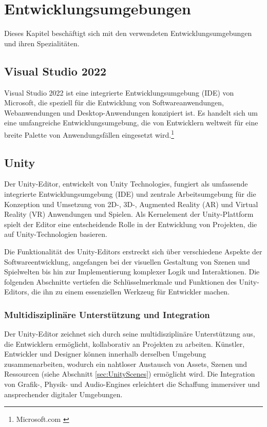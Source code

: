 \section{Entwicklungsumgebungen}
Dieses Kapitel beschäftigt sich mit den verwendeten Entwicklungsumgebungen und ihren Spezialitäten.

\subsection{Visual Studio 2022}
Visual Studio 2022 ist eine integrierte Entwicklungsumgebung (IDE) von Microsoft, die speziell für die Entwicklung von
Softwareanwendungen, Webanwendungen und Desktop-Anwendungen konzipiert ist. Es handelt sich um eine umfangreiche
Entwicklungsumgebung, die von Entwicklern weltweit für eine breite Palette von Anwendungsfällen eingesetzt wird.\footnote{Microsoft.com \cite{Visual Studio 2022}}

\subsection{Unity}
Der Unity-Editor, entwickelt von Unity Technologies, fungiert als umfassende integrierte Entwicklungsumgebung (IDE)
und zentrale Arbeitsumgebung für die Konzeption und Umsetzung von 2D-, 3D-, Augmented Reality (AR) und Virtual Reality
(VR) Anwendungen und Spielen. Als Kernelement der Unity-Plattform spielt der Editor eine entscheidende Rolle in der
Entwicklung von Projekten, die auf Unity-Technologien basieren.

Die Funktionalität des Unity-Editors erstreckt sich über verschiedene Aspekte der Softwareentwicklung, angefangen bei
der visuellen Gestaltung von Szenen und Spielwelten bis hin zur Implementierung komplexer Logik und Interaktionen. Die
folgenden Abschnitte vertiefen die Schlüsselmerkmale und Funktionen des Unity-Editors, die ihn zu einem essenziellen
Werkzeug für Entwickler machen.

\subsubsection{Multidisziplinäre Unterstützung und Integration}
Der Unity-Editor zeichnet sich durch seine multidisziplinäre Unterstützung aus, die Entwicklern ermöglicht, kollaborativ
an Projekten zu arbeiten. Künstler, Entwickler und Designer können innerhalb derselben Umgebung zusammenarbeiten,
wodurch ein nahtloser Austausch von Assets, Szenen und Ressourcen (siehe Abschnitt \ref{sec:UnityScenes}) ermöglicht wird. Die Integration von Grafik-,
Physik- und Audio-Engines erleichtert die Schaffung immersiver und ansprechender digitaler Umgebungen.

